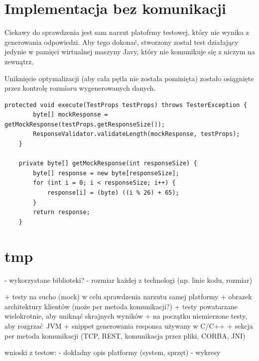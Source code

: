 \section{Implementacja bez komunikacji}

Ciekawy do sprawdzenia jest sam narzut platofrmy testowej, który nie wynika z generowania odpowiedzi. Aby tego dokonać, stworzony został test działający jedynie w pamięci wirtualnej maszyny Javy, który nie komunikuje się z niczym na zewnątrz.

Uniknięcie optymalizacji (aby cała pętla nie została pominięta) zostało osiągnięte przez kontrolę rozmiaru wygenerowanych danych.

\begin{lstlisting}[caption={Test sprawdzający narzut samej platformy.},captionpos=b]
    protected void execute(TestProps testProps) throws TesterException {
        byte[] mockResponse = getMockResponse(testProps.getResponseSize());
        ResponseValidator.validateLength(mockResponse, testProps);
    }

    private byte[] getMockResponse(int responseSize) {
        byte[] response = new byte[responseSize];
        for (int i = 0; i < responseSize; i++) {
            response[i] = (byte) ((i % 26) + 65);
        }
        return response;
    }
\end{lstlisting}


\section{tmp}

- wykorzystane biblioteki?
- rozmiar każdej z technologi (np. linie kodu, rozmiar)

+ testy na sucho (mock) w celu sprawdzenia narzutu samej platformy
+ obrazek architektury klientów (może per metoda komunikacji?)
+ testy powatarzane wielokrotnie, aby uniknąć skrajnych wyników
+ na początku niemierzone testy, aby rozgrzać JVM
+ snippet generowania responsa używany w C/C++
+ sekcja per metoda komunikacji (TCP, REST, komunikacja przez pliki, CORBA, JNI)

wnioski z testow:
- dokladny opis platformy (system, sprzęt)
- wykresy